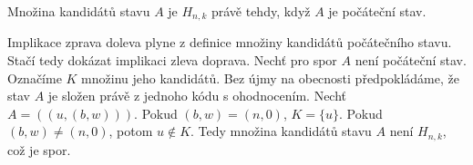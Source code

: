 \begin{lemma}\label{lemmakandidatipocstavu}
    Množina kandidátů stavu $A$ je $H_{n,k}$ právě tehdy, když $A$ je počáteční stav.
\end{lemma}
\begin{dukaz}
    Implikace zprava doleva plyne z definice množiny kandidátů počátečního stavu. Stačí tedy dokázat implikaci zleva doprava. Nechť pro spor $A$ není počáteční stav. Označíme $K$ množinu jeho kandidátů. Bez újmy na obecnosti předpokládáme, že stav $A$ je složen právě z jednoho kódu s ohodnocením. Nechť $A = ((u, (b,w)))$. Pokud $(b,w) = (n,0)$, $K = \{u\}$. Pokud $(b,w) \neq (n,0)$, potom $u \notin K$. Tedy množina kandidátů stavu $A$ není $H_{n,k}$, což je spor. 
\end{dukaz}

